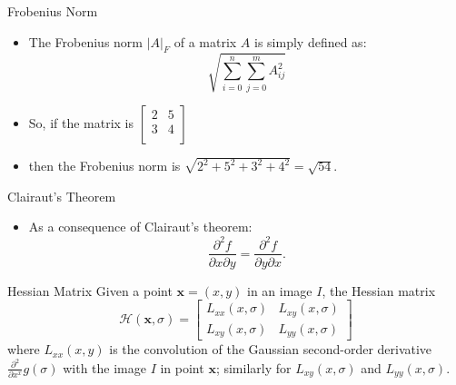 \documentclass[xcolor=dvipsnames]{beamer}
\begin{document}
\begin{frame}[label=math-frobenius]{Frobenius Norm}
\begin{itemize} 
\item The Frobenius norm $|A|_F$ of a matrix $A$ is simply defined as:
\begin{equation}
 \sqrt{\sum_{i=0}^n \sum_{j=0}^m A_{ij}^2}
\end{equation}
\item So, if the matrix is 
 $
 \begin{bmatrix}
  2 & 5 \\
  3 & 4 \\
 \end{bmatrix}
 $
\item then the Frobenius norm is 
 $\sqrt{2^2 + 5^2 + 3^2 + 4^2} = \sqrt{54}$.
\end{itemize} 
\end{frame}

\begin{frame}[label=math-clairaut]{Clairaut's Theorem}
 \begin{itemize} 
  \item As a consequence of Clairaut's theorem:
 \begin{equation}
  \frac{\partial^2 f}{\partial x \partial y} = 
  \frac{\partial^2 f}{\partial y \partial x}.
 \end{equation}
 \end{itemize}  
\end{frame}

\begin{frame}[label=math-hessian]{Hessian Matrix}
Given a point $\mathbf{x} = (x,y)$ in an image $I$, the Hessian matrix 
\begin{equation}
\mathcal{H}(\mathbf{x}, \sigma) =
 \begin{bmatrix}
  L_{xx}(x,\sigma) &
  L_{xy}(x,\sigma) \\
  L_{xy}(x,\sigma) &
  L_{yy}(x,\sigma) 
 \end{bmatrix}
\end{equation}
where $L_{xx}(x,y)$ is the convolution of the Gaussian second-order derivative 
$\frac{\partial^2}{\partial x^x}g(\sigma)$ with the image $I$ in point $\mathbf{x}$; similarly for 
  $L_{xy}(x,\sigma)$ and
  $L_{yy}(x,\sigma)$.
\end{frame}
\end{document}
